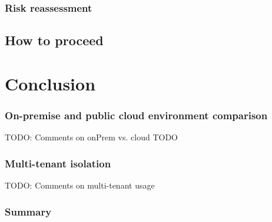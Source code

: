 \subsection{Risk reassessment}

\section{How to proceed}

\chapter{Conclusion}

\subsection{On-premise and public cloud environment comparison}
TODO: Comments on onPrem vs. cloud
TODO

\subsection{Multi-tenant isolation}
TODO: Comments on multi-tenant usage

\subsection{Summary}


